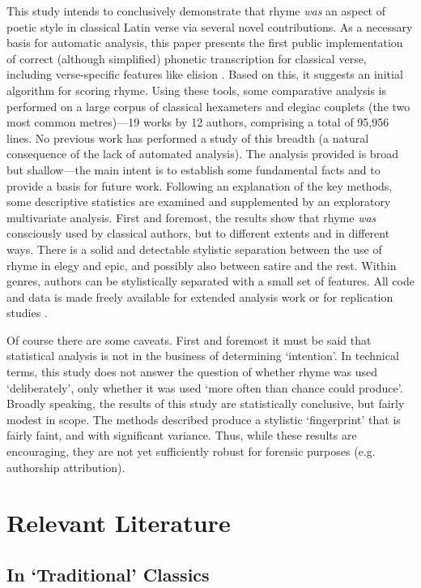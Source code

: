 \documentclass[twocolumn, switch, a4paper]{article} %
\begin{document}
This study intends to conclusively demonstrate that rhyme \emph{was} an aspect
of poetic style in classical Latin verse via several novel contributions. As a
necessary basis for automatic analysis, this paper presents the first public
implementation of correct (although simplified) phonetic transcription for
classical verse, including verse-specific features like elision
\cite{nagy_mqdq_2019}. Based on this, it suggests an initial algorithm for
scoring rhyme. Using these tools, some comparative analysis is performed on a
large corpus of classical hexameters and elegiac couplets (the two most common
metres)---19 works by 12 authors, comprising a total of 95,956 lines. No
previous work has performed a study of this breadth (a natural consequence of
the lack of automated analysis). The analysis provided is broad but
shallow---the main intent is to establish some fundamental facts and to
provide a basis for future work. Following an explanation of the key methods,
some descriptive statistics are examined and supplemented by an exploratory
multivariate analysis. First and foremost, the results show that rhyme
\emph{was} consciously used by classical authors, but to different extents and
in different ways. There is a solid and detectable stylistic separation
between the use of rhyme in elegy and epic, and possibly also between satire
and the rest. Within genres, authors can be stylistically separated with a
small set of features. All code and data is made freely available for extended
analysis work or for replication studies \cite{nagy_rhyme_2021}.

Of course there are some caveats. First and foremost it must be said that
statistical analysis is not in the business of determining `intention'. In
technical terms, this study does not answer the question of whether rhyme was
used `deliberately', only whether it was used `more often than chance could
produce'. Broadly speaking, the results of this study are statistically
conclusive, but fairly modest in scope. The methods described produce a
stylistic `fingerprint' that is fairly faint, and with significant variance.
Thus, while these results are encouraging, they are not yet sufficiently
robust for forensic purposes (e.g. authorship attribution).

\section{Relevant Literature}
\label{sec:lit}

\subsection{In `Traditional' Classics}
\end{document}

